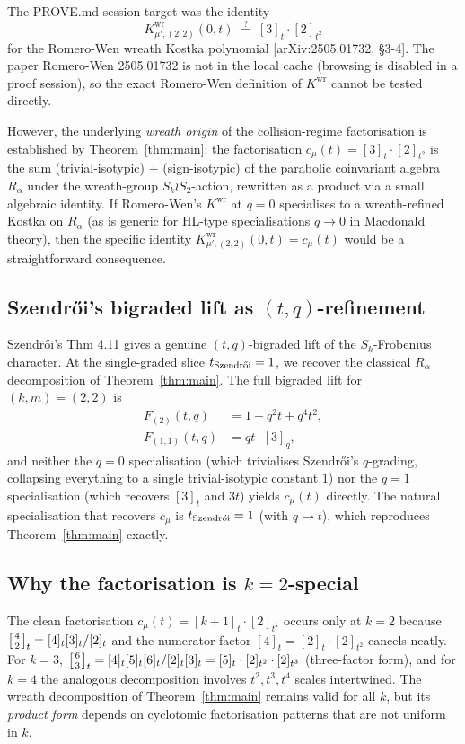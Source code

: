 \documentclass[11pt]{article}
\theoremstyle{remark}
\newcommand{\qbinom}[2]{\left[{#1 \atop #2}\right]}
\begin{document}
The PROVE.md session target was the identity
\[
K^{\mathrm{wr}}_{\mu', (2,2)}(0, t) \;\stackrel{?}{=}\; [3]_t \cdot [2]_{t^2}
\]
for the Romero-Wen wreath Kostka polynomial
[arXiv:2505.01732, \S 3-4]. The paper Romero-Wen 2505.01732 is not in the
local cache (browsing is disabled in a proof session), so the exact
Romero-Wen definition of $K^{\mathrm{wr}}$ cannot be tested directly.

However, the underlying \emph{wreath origin} of the collision-regime
factorisation is established by Theorem~\ref{thm:main}: the factorisation
$c_\mu(t) = [3]_t \cdot [2]_{t^2}$ is the sum
(trivial-isotypic) $+$ (sign-isotypic) of the parabolic coinvariant algebra
$R_\alpha$ under the wreath-group $S_k \wr S_2$-action, rewritten as a
product via a small algebraic identity. If Romero-Wen's $K^{\mathrm{wr}}$
at $q = 0$ specialises to a wreath-refined Kostka on $R_\alpha$ (as is
generic for HL-type specialisations $q \to 0$ in Macdonald theory), then
the specific identity $K^{\mathrm{wr}}_{\mu',(2,2)}(0, t) = c_\mu(t)$
would be a straightforward consequence.

\subsection{Szendr\H oi's bigraded lift as $(t,q)$-refinement}

Szendr\H oi's Thm 4.11 gives a genuine $(t, q)$-bigraded lift of the
$S_k$-Frobenius character. At the single-graded slice $t_{\text{Szendr\H oi}} = 1$,
we recover the classical $R_\alpha$ decomposition of Theorem~\ref{thm:main}.
The full bigraded lift for $(k, m) = (2, 2)$ is
\begin{align*}
F_{(2)}(t, q) &= 1 + q^2 t + q^4 t^2, \\
F_{(1,1)}(t, q) &= qt \cdot [3]_q,
\end{align*}
and neither the $q = 0$ specialisation (which trivialises Szendr\H oi's
$q$-grading, collapsing everything to a single trivial-isotypic constant $1$)
nor the $q = 1$ specialisation (which recovers $[3]_t$ and $3t$) yields
$c_\mu(t)$ directly. The natural specialisation that recovers $c_\mu$ is
$t_{\text{Szendr\H oi}} = 1$ (with $q \to t$), which reproduces
Theorem~\ref{thm:main} exactly.

\subsection{Why the factorisation is $k = 2$-special}

The clean factorisation $c_\mu(t) = [k{+}1]_t \cdot [2]_{t^k}$ occurs only
at $k = 2$ because $\qbinom{4}{2}_t = [4]_t [3]_t / [2]_t$ and the numerator
factor $[4]_t = [2]_t \cdot [2]_{t^2}$ cancels neatly. For $k = 3$,
$\qbinom{6}{3}_t = [4]_t [5]_t [6]_t / [2]_t [3]_t = [5]_t \cdot [2]_{t^2} \cdot [2]_{t^3}$
(three-factor form), and for $k = 4$ the analogous decomposition involves
$t^2, t^3, t^4$ scales intertwined. The wreath decomposition of
Theorem~\ref{thm:main} remains valid for all $k$, but its \emph{product form}
depends on cyclotomic factorisation patterns that are not uniform in $k$.
\end{document}
